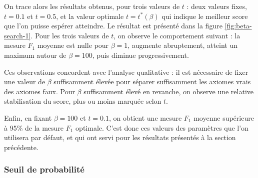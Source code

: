 On trace alors les résultats obtenus, pour trois valeurs de $t$ : deux valeurs fixes, $t = 0.1$ et $t = 0.5$, et la valeur optimale $t = t^*(\beta)$ qui indique le meilleur score que l'on puisse espérer atteindre. Le résultat est présenté dans la figure \ref{fig:beta-search-1}. Pour les trois valeurs de $t$, on observe le comportement suivant : la mesure $F_1$ moyenne est nulle pour $\beta = 1$, augmente abruptement, atteint un maximum autour de $\beta = 100$, puis diminue progressivement. 

Ces observations concordent avec l'analyse qualitative : il est nécessaire de fixer une valeur de $\beta$ suffisamment élevée pour séparer suffisamment les axiomes vrais des axiomes faux. Pour $\beta$ suffisamment élevé en revanche, on observe une relative stabilisation du score, plus ou moins marquée selon $t$. 

Enfin, en fixant $\beta = 100$ et $t=0.1$, on obtient une mesure $F_1$ moyenne supérieure à 95\% de la mesure $F_1$ optimale. C'est donc ces valeurs des paramètres que l'on utilisera par défaut, et qui ont servi pour les résultats présentés à la section précédente.


\subsubsection{Seuil de probabilité}

